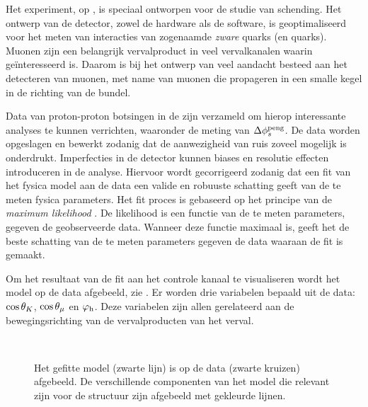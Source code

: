 Het \lhcb experiment, op \cern, is speciaal ontworpen voor de studie van \CP schending.
Het ontwerp van de detector, zowel de hardware als de software, is geoptimaliseerd voor het meten
van interacties van zogenaamde {\it zware} quarks (\bquark en \cquark quarks). Muonen zijn een
belangrijk vervalproduct in veel vervalkanalen waarin \lhcb ge\"interesseerd is.
Daarom is bij het ontwerp van \lhcb veel aandacht besteed aan het detecteren van muonen,
met name van muonen die propageren in een smalle kegel in de richting van de bundel.

Data van proton-proton botsingen in de \lhc zijn verzameld om hierop interessante analyses te
kunnen verrichten, waaronder de meting van  $\Delta\phi_{s}^{\tiny\text{peng}}$. De data worden opgeslagen en
bewerkt zodanig dat de aanwezigheid van ruis zoveel mogelijk is onderdrukt. Imperfecties in de
detector kunnen biases en resolutie effecten introduceren in de analyse. Hiervoor wordt gecorrigeerd
zodanig dat een fit van het fysica model aan de data een valide en robuuste schatting geeft van de te
meten fysica parameters. Het fit proces is gebaseerd op het principe van de {\it maximum likelihood} \cite{cowan1998statistical}.
De likelihood is een functie van de te meten parameters, gegeven de geobserveerde data. Wanneer deze functie maximaal is, geeft
het de beste schatting van de te meten parameters gegeven de data waaraan de fit is gemaakt.

Om het resultaat van de fit aan het \BsJpsiKst controle kanaal te visualiseren wordt het model op de data
afgebeeld, zie . Er worden drie variabelen bepaald uit de data: $\cos\theta_{K}$,
$\cos\theta_{\mu}$ en $\varphi_{\rm h}$. Deze variabelen zijn allen gerelateerd aan de bewegingsrichting van de vervalproducten
van het \BsJpsiKst verval.

\begin{figure}[!t]
  \begin{subfigure}{0.5\textwidth}
    \centering
    \scalebox{1.2}{}
  \end{subfigure}%
  \hfill
  \begin{subfigure}{0.5\textwidth}
    \centering
    \scalebox{1.2}{}
  \end{subfigure}\\
  \begin{subfigure}{\textwidth}
    \centering
    \scalebox{1.2}{}
  \end{subfigure}
  \caption{Het gefitte model (zwarte lijn) is op de \BsJpsiKst data (zwarte kruizen) afgebeeld.
          De verschillende componenten van het model die relevant zijn voor de \CP structuur zijn afgebeeld met gekleurde lijnen.}
  \label{app_nl_angular_plot_thetas}
\end{figure}

